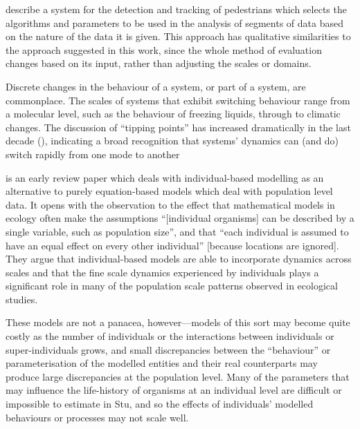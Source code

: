 \Cite{DBLP:ZhangZR16} describe a system for the
detection and tracking of pedestrians which selects the algorithms and
parameters to be used in the analysis of segments of data based on the
nature of the data it is given. This approach has qualitative
similarities to the approach suggested in this work, since the whole
method of evaluation changes based on its input, rather than 
adjusting the scales or domains.

Discrete changes in the behaviour of a system, or part of a system,
are commonplace. The scales of systems that exhibit switching
behaviour range from a molecular level, such as the behaviour of
freezing liquids, through to climatic changes.  The discussion of
``tipping points'' has increased dramatically in the last decade
(\citep{bhatanacharoentipping}), indicating a broad recognition that
systems' dynamics can (and do) switch rapidly from one mode to another

\Cite{huston1988new} is an early review paper which deals with
individual-based modelling as an alternative to purely equation-based
models which deal with population level data.  It opens with the
observation to the effect that mathematical models in ecology often
make the assumptions ``[individual organisms] can be described by a
single variable, such as population size'', and that ``each individual
is assumed to have an equal effect on every other individual''
[because locations are ignored]. They argue that individual-based
models are able to incorporate dynamics across scales and that the
fine scale dynamics experienced by individuals plays a significant
role in many of the population scale patterns observed in ecological
studies. 

These models are not a panacea, however---models of this sort may
become quite costly as the number of individuals or the interactions
between individuals or super-individuals grows, and small
discrepancies between the ``behaviour'' or parameterisation of the
modelled entities and their real counterparts may produce large
discrepancies at the population level. Many of the parameters that may
influence the life-history of organisms  at an individual level are
difficult or impossible to estimate in Stu, and so the effects of
individuals' modelled behaviours or processes may not scale well.


